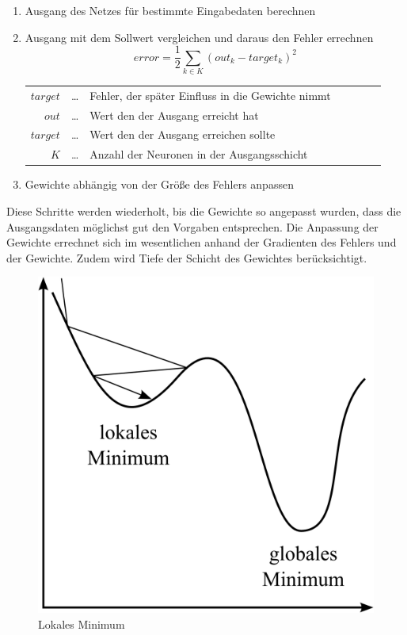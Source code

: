 \begin{enumerate}
\item Ausgang des Netzes für bestimmte Eingabedaten berechnen
\item Ausgang mit dem Sollwert vergleichen und daraus den Fehler errechnen
	$$error = \frac{1}{2}\sum_{k \in K}(out_k-target_k)^2$$
	\begin{center}\begin{tabular}{rclcrcl}
		$target$ & \dots & Fehler, der später Einfluss in die Gewichte nimmt\\
		$out$ & \dots & Wert den der Ausgang erreicht hat\\
		$target$ & \dots & Wert den der Ausgang erreichen sollte\\ 
		$K$ & \dots & Anzahl der Neuronen in der Ausgangsschicht\\
	\end{tabular}\end{center}
\item Gewichte abhängig von der Größe des Fehlers anpassen
\end{enumerate}

Diese Schritte werden wiederholt, bis die Gewichte so angepasst wurden, dass die Ausgangsdaten möglichst gut den Vorgaben entsprechen. Die Anpassung der Gewichte errechnet sich im wesentlichen anhand der Gradienten des Fehlers und der Gewichte. Zudem wird Tiefe der Schicht des Gewichtes berücksichtigt.

\begin{figure}
	\centering
	\includegraphics[scale=1]{images/lokales-minimum.png}
	\caption{Lokales Minimum}
	\label{fig:local-min}
\end{figure}

